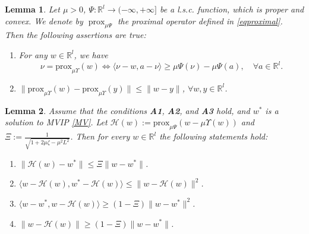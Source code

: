 \documentclass{article}
\theoremstyle{plain}%
\newtheorem{lemma}{Lemma}[section]%
\theoremstyle{thmstyletwo}%
\theoremstyle{thmstylethree}%
\begin{document}
\begin{lemma}\cite{10}\label{EPvklem6}
Let $\mu > 0$, $\Psi : \mathbb{R}^l \rightarrow (-\infty, +\infty]$ be a l.s.c. function, which is proper and convex. We denote by $\operatorname{prox}_{\mu \Psi}$ the proximal operator defined in \eqref{eqproximal}.
 Then the following assertions are true:
\begin{enumerate}
    \item For any $w\in \mathbb{R}^l$, we have
    \[
    \nu = \text{prox}_{\mu \Upsilon}(w) \Leftrightarrow \langle \nu -w, a - \nu \rangle \geq \mu \Psi(\nu) - \mu \Psi(a), \quad \forall a \in \mathbb{R}^l.
    \]
    \item $\|\text{prox}_{\mu \Upsilon}(w) - \text{prox}_{\mu \Upsilon}(y)\| \leq \|w - y\|$, $\forall w, y \in \mathbb{R}^l$.\\
\end{enumerate}
\end{lemma}
 

\begin{lemma}\label{lemE2.5}\cite{21,22}
Assume that the conditions \textbf{A1}, \textbf{A2}, and \textbf{A3} hold, and $w^*$ is a solution to MVIP  \eqref{MV}. Let $\mathcal{H}(w) := \text{prox}_{\mu\Psi}(w -\mu\Upsilon(w))$ and $\Xi := \frac{1}{\sqrt{1+2\mu \zeta - \mu^2 L^2}}$. Then for every $w \in\mathbb{R}^l$ the following statements hold:
\begin{enumerate}[label=\textnormal{(\roman*)}]
    \item $\|\mathcal{H}(w) - w^* \| \leq \Xi \|w - w^* \|$.
    \item $\langle w -\mathcal{H}(w), w^* -\mathcal{H}(w) \rangle \leq \|w -\mathcal{H}(w) \|^2$.
    \item $\langle w - w^*, w -\mathcal{H}(w) \rangle \geq (1- \Xi) \|w - w^* \|^2$.
    \item $\|w -\mathcal{H}(w) \| \geq (1- \Xi) \|w - w^* \|$.
\end{enumerate}
\end{lemma}
\end{document}
